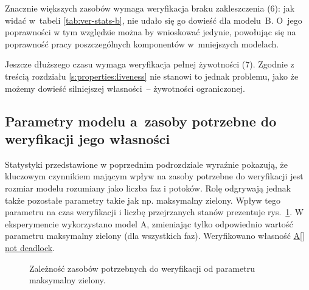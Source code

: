 \documentclass{pracamgr}
\newcommand{\imgr}[1]{rys.~\ref{#1}}
\newcommand{\ttt}[1]{\url{#1}}
\theoremstyle{plain}
\begin{document}
Znacznie większych zasobów wymaga weryfikacja braku zakleszczenia (6):
jak widać w~tabeli \ref{tab:ver-stats-b}, nie udało się go dowieść dla
modelu~B. O~jego poprawności w tym względzie można by wnioskować
jedynie, powołując się na poprawność pracy poszczególnych komponentów
w~mniejszych modelach.

Jeszcze dłuższego czasu wymaga weryfikacja pełnej żywotności
(7). Zgodnie z treścią rozdziału \ref{s:properties:liveness} nie
stanowi to jednak problemu, jako że możemy dowieść silniejszej
własności~-- żywotności ograniczonej.


\subsection{Parametry modelu a~zasoby potrzebne do weryfikacji jego
  własności}
Statystyki przedstawione w poprzednim podrozdziale wyraźnie pokazują,
że kluczowym czynnikiem mającym wpływ na zasoby potrzebne do
weryfikacji jest rozmiar modelu rozumiany jako liczba faz i
potoków. Rolę odgrywają jednak także pozostałe parametry takie jak
np. maksymalny zielony.  Wpływ tego parametru na czas weryfikacji i
liczbę przejrzanych stanów prezentuje \imgr{img:max-time-chart}. W
eksperymencie wykorzystano model A, zmieniając tylko odpowiednio
wartość parametru maksymalny zielony (dla wszystkich faz). Weryfikowano
własność \ttt{A[] not deadlock}.
\begin{figure}
  \centering
  \hspace{0.5cm}
  \caption{Zależność zasobów potrzebnych do weryfikacji od parametru maksymalny zielony.}
  \label{img:max-time-chart}
\end{figure}
\end{document}
